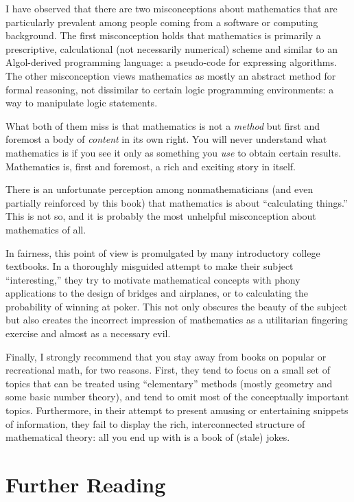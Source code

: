 
I have observed that there are two misconceptions about mathematics
that are particularly prevalent among people coming from a software or
computing background.  The first misconception holds that mathematics
is primarily a prescriptive, calculational (not necessarily numerical)
scheme and similar to an Algol-derived programming language: a
pseudo-code for expressing algorithms.  The other misconception views
mathematics as mostly an abstract method for formal reasoning, not
dissimilar to certain logic programming environments: a way to
manipulate logic statements.

What both of them miss is that mathematics is not a \emph{method} but
first and foremost a body of \emph{content} in its own right. You will
never understand what mathematics is if you see it only as something
you \emph{use} to obtain certain results. Mathematics is, first and
foremost, a rich and exciting story in itself.

There is an unfortunate perception among nonmathematicians (and even
partially reinforced by this book) that mathematics is about
``calculating things.'' This is not so, and it is probably the most
unhelpful misconception about mathematics of all.

In fairness, this point of view is promulgated by many introductory
college textbooks. In a thoroughly misguided attempt to make their
subject ``interesting,'' they try to motivate mathematical concepts
with phony applications to the design of bridges and airplanes, or to
calculating the probability of winning at poker. This not only
obscures the beauty of the subject but also creates the incorrect
impression of mathematics as a utilitarian fingering exercise and
almost as a necessary evil.

Finally, I strongly recommend that you stay away from books on popular
or recreational math, for two reasons. First, they tend to focus on a
small set of topics that can be treated using ``elementary'' methods
(mostly geometry and some basic number theory), and tend to omit most
of the conceptually important\vadjust{\pagebreak} topics.  Furthermore, in their attempt
to present amusing or entertaining snippets of information, they fail
to display the rich, interconnected structure of mathematical theory:
all you end up with is a book of (stale) jokes.\vspace*{-6pt}


\section{Further Reading}

